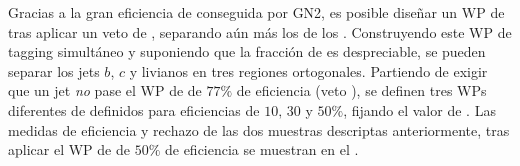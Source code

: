 Gracias a la gran eficiencia de \btagging conseguida por GN2, es posible diseñar un \ac{WP} de \ctagging tras aplicar un veto de \btagging, separando aún más los \cjets de los \ljets. Construyendo este \ac{WP} de tagging simultáneo y suponiendo que la fracción de \tjets es despreciable, se pueden separar los jets \(b\), \(c\) y livianos en tres regiones ortogonales. Partiendo de exigir que un jet \textit{no} pase el \ac{WP} de \btagging de \(77\%\) de eficiencia (veto \btag), se definen tres \acp{WP} diferentes de \ctagging definidos para eficiencias de \(10, \, 30\) y \(50\%\), fijando el valor de \gntc. Las medidas de eficiencia y rechazo de las dos muestras descriptas anteriormente, tras aplicar el \ac{WP} de \ctag de \(50\%\) de eficiencia se muestran en el \Tab{\ref{tab:objects:ftag:ctag_efficiency_original}}.

\begin{table}[ht!]
    \caption{Medidas de eficiencia de \ctagging para \cjets, y valores de rechazos de \bjets, \ljets y \tjets en los regímenes de bajo y alto \pt. Los valores corresponden a aquellos luego de aplicar el veto del \ac{WP} de \btagging de \(77\%\) y de \(50\%\)  de \ctagging.}%
    \label{tab:objects:ftag:ctag_efficiency_original}
\end{table}